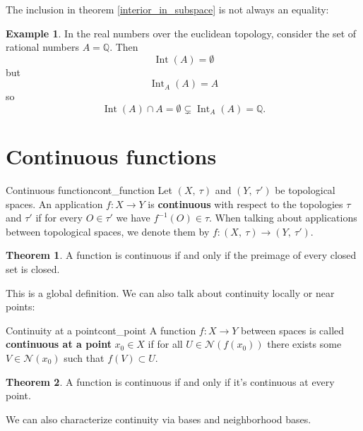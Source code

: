 \documentclass[a4paper]{book}
\theoremstyle{definition}
\newtheorem{theorem}{Theorem}[section]
\theoremstyle{ejemplo}
\newtheorem{example}{Example}[section]
\theoremstyle{demostracion}
\newcommand{\racionales}{\mathbb{Q}}
\DeclareMathOperator{\interior}{Int}
\begin{document}
The inclusion in theorem \eqref{interior_in_subspace} is not always an equality:
\begin{example}
	In the real numbers over the euclidean topology, consider the set of rational numbers $A = \racionales$. Then
	\begin{equation*}
		\interior(A) = \emptyset
	\end{equation*}
	but
	\begin{equation*}
		\interior_A(A) = A
	\end{equation*}
	so
	\begin{equation*}
		\interior(A) \cap A = \emptyset \subsetneq \interior_A(A) = \racionales.
	\end{equation*}
\end{example}

\section{Continuous functions}
\begin{define}{Continuous function}{cont_function}
	Let $(X,\ \tau)$ and $(Y,\ \tau')$ be topological spaces. An application $f: X \rightarrow Y$ is \textbf{continuous} with respect to the topologies $\tau$ and $\tau'$ if for every $O \in \tau'$ we have $f^{-1}(O) \in \tau$. When talking about applications between topological spaces, we denote them by $f: (X,\ \tau) \rightarrow (Y,\ \tau')$.
\end{define}

\begin{theorem}
	A function is continuous if and only if the preimage of every closed set is closed.
\end{theorem}

This is a global definition. We can also talk about continuity locally or near points:

\begin{define}{Continuity at a point}{cont_point}
	A function $f: X \rightarrow Y$ between spaces is called \textbf{continuous at a point} $x_0 \in X$ if for all $U \in \mathcal{N}(f(x_0))$ there exists some $V \in \mathcal{N}(x_0)$ such that $f(V) \subset U$.
\end{define}

\begin{theorem}
	A function is continuous if and only if it's continuous at every point.
\end{theorem}

We can also characterize continuity via bases and neighborhood bases.
\end{document}
